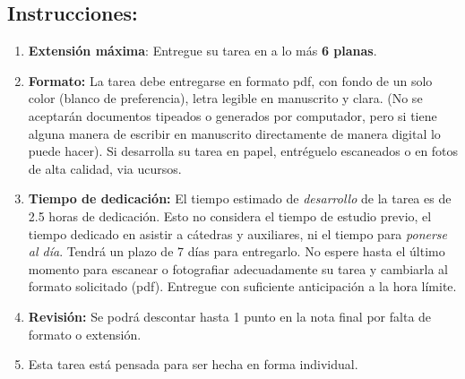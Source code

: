 \documentclass{article}
\theoremstyle{plain}
\theoremstyle{definition}
\theoremstyle{Azul}
\begin{document}
\subsection*{Instrucciones:} 
\begin{enumerate}
\item \textbf{Extensión máxima}: Entregue su tarea en a lo más \textbf{6 planas}.
    \item \textbf{Formato:} La tarea debe entregarse en formato pdf, con fondo de un solo color (blanco de preferencia), letra legible en manuscrito y clara. (No se aceptarán documentos tipeados o generados por computador, pero si tiene alguna manera de escribir en manuscrito directamente de manera digital lo puede hacer).
    Si desarrolla su tarea en papel, entréguelo escaneados o en fotos de alta calidad, via ucursos.    \item \textbf{Tiempo de dedicación:} El tiempo estimado de \emph{desarrollo} de la tarea es de 2.5 horas de dedicación. Esto no considera el tiempo de estudio previo, el tiempo dedicado en asistir a cátedras y auxiliares, ni el tiempo para \emph{ponerse al día}. Tendrá un plazo de 7 días para entregarlo. No espere hasta el último momento para escanear o fotografiar adecuadamente su tarea y cambiarla al formato solicitado (pdf). Entregue con suficiente anticipación a la hora límite.
    \item \textbf{Revisión:} Se podrá descontar hasta 1 punto en la nota final por falta de formato o extensión.
\item Esta tarea está pensada para ser hecha en forma individual.
	\end{enumerate}
\end{document}
